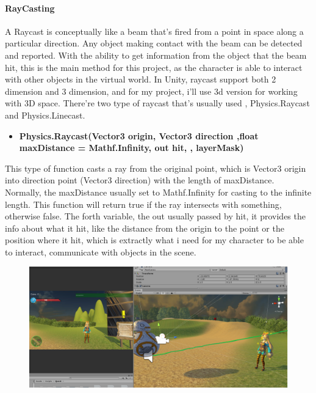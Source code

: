 \documentclass[a4paper, 13pt]{extarticle}
\begin{document}
\paragraph{RayCasting}
  A Raycast is conceptually like a beam that's fired from a point in space along a particular direction. Any object making contact with the beam can be detected and reported. With the ability to get information from the object that the beam hit, this is the main method for this project, as the character is able to interact with other objects in the virtual world. In Unity, raycast support both 2 dimension and 3 dimension, and for my project, i'll use 3d version for working with 3D space. There're two type of raycast that's usually used , Physics.Raycast and Physics.Linecast.
  \begin{itemize}
  	\item \bfseries Physics.Raycast(Vector3 origin,  Vector3 direction ,float maxDistance = Mathf.Infinity, out hit, , layerMask)	 	
  \end{itemize}
 	This type of function casts a ray from the original point, which is Vector3 origin into direction point (Vector3 direction) with the length of maxDistance. Normally, the maxDistance usually set to Mathf.Infinity for casting to the infinite length. This function will return true if the ray intersects with something, otherwise false. The forth variable, the out usually passed by hit, it provides the info about what it hit, like the distance from the origin to the point or the position where it hit, which is extractly what i need for my character to be able to interact, communicate with objects in the scene.
 	\begin{figure}[h]
 		
 		\begin{minipage}{1\textwidth}
 			\centering
 			\includegraphics[width=1\linewidth]{intructions/RayCast_example1.png}
 			\centering
 			\label{fig:test14}
 		\end{minipage}
 	
 	\end{figure} 
 	
\end{document}

